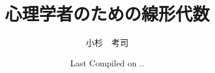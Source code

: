 \documentclass[dvipsnames]{ltjsbook}
\begin{document}

\VerbatimFootnotes
\title{心理学者のための線形代数}
\author{小杉　考司}
\date{Last Compiled on \number\year .\number\month .\number\day}
\maketitle
\setcounter{tocdepth}{1}








\printindex
\end{document}
